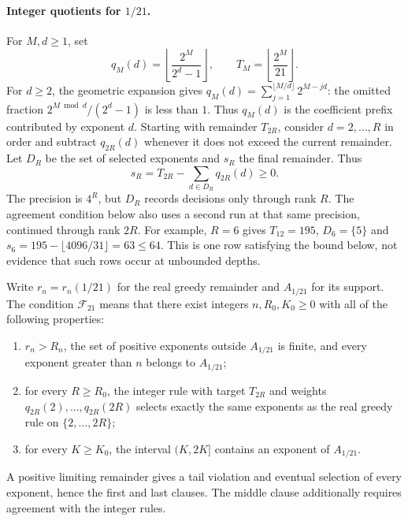 \documentclass[11pt]{article}
\begin{document}
\paragraph{Integer quotients for $1/21$.}
For $M,d\ge1$, set
\[
 q_M(d)=\left\lfloor\frac{2^M}{2^d-1}\right\rfloor,
 \qquad T_M=\left\lfloor\frac{2^M}{21}\right\rfloor.
\]
For $d\ge2$, the geometric expansion gives
$q_M(d)=\sum_{j=1}^{\lfloor M/d\rfloor}2^{M-jd}$: the omitted fraction
$2^{M\bmod d}/(2^d-1)$ is less than $1$. Thus $q_M(d)$ is the
coefficient prefix contributed by exponent $d$.
Starting with remainder $T_{2R}$, consider $d=2,\ldots,R$ in order and
subtract $q_{2R}(d)$ whenever it does not exceed the current remainder.  Let $D_R$ be the set of selected exponents and $s_R$ the final
remainder.  Thus
\[
 s_R=T_{2R}-\sum_{d\in D_R}q_{2R}(d)\ge0.
\]
The precision is $4^R$, but $D_R$ records decisions only through
rank $R$. The agreement condition below also uses a second run at
that same precision, continued through rank $2R$.
For example, $R=6$ gives $T_{12}=195$, $D_6=\{5\}$ and
$s_6=195-\lfloor4096/31\rfloor=63\le64$.  This is one row satisfying
the bound below, not evidence that such rows occur at unbounded depths.


Write $r_n=r_n(1/21)$ for the real greedy remainder and $A_{1/21}$ for its
support.  The condition $\mathcal F_{21}$ means that there exist integers
$n,R_0,K_0\ge0$ with all of the following properties:
\begin{enumerate}
\item $r_n>R_n$, the set of positive exponents outside $A_{1/21}$ is
finite, and every exponent greater than $n$ belongs to $A_{1/21}$;
\item for every $R\ge R_0$, the integer rule with target $T_{2R}$ and
weights $q_{2R}(2),\ldots,q_{2R}(2R)$ selects exactly the same exponents
as the real greedy rule on $\{2,\ldots,2R\}$;
\item for every $K\ge K_0$, the interval $(K,2K]$ contains an exponent
of $A_{1/21}$.
\end{enumerate}
A positive limiting remainder gives a tail violation and eventual
selection of every exponent, hence the first and last clauses.
The middle clause additionally requires agreement with the integer rules.
\end{document}
